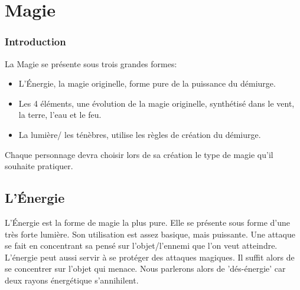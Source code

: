 
\section{Magie}
\subsubsection{Introduction}
La Magie se présente sous trois grandes formes:
\begin{itemize}
\item L'Énergie, la magie originelle, forme pure de la puissance du démiurge.
\item Les 4 éléments, une évolution de la magie originelle, synthétisé dans le vent, la terre, l'eau et le feu. 
\item La lumière/ les ténèbres, utilise les règles de création du démiurge.
\end{itemize}
Chaque personnage devra choisir lors de sa création le type de magie qu'il souhaite pratiquer.
\subsection{L'Énergie}
L'Énergie est la forme de magie la plus pure. Elle se présente sous forme d'une très forte lumière. Son utilisation est assez basique, mais puissante. 
Une attaque se fait en concentrant sa pensé sur l'objet/l'ennemi que l'on veut atteindre.
L'énergie peut aussi servir à se protéger des attaques magiques. Il suffit alors de se concentrer sur l'objet qui menace. Nous parlerons alors de 'dés-énergie' car deux rayons énergétique s'annihilent. 
